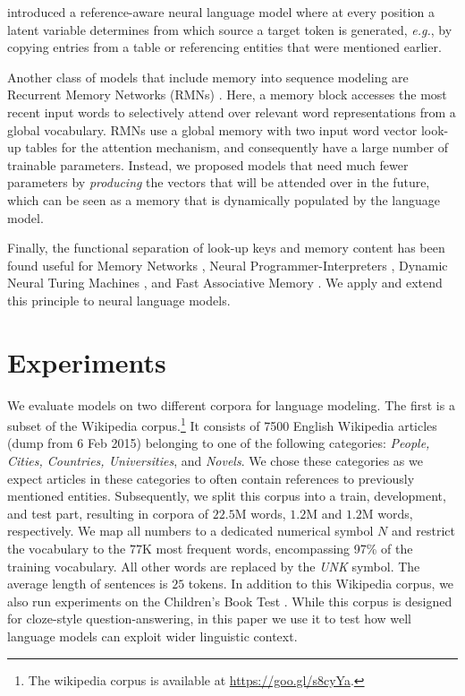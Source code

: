 \documentclass{article}
\newcommand{\eg}{{\emph{e.g.}}}
\begin{document}
\cite{yang2016reference} introduced a reference-aware neural language model where at every position a latent variable determines from which source a target token is generated, \eg{}, by copying entries from a table or referencing entities that were mentioned earlier.

Another class of models that include memory into sequence modeling are Recurrent Memory Networks (RMNs) \citep{tran2016recurrent}. 
Here, a memory block accesses the most recent input words to selectively attend over relevant word representations from a global vocabulary. 
RMNs use a global memory with two input word vector look-up tables for the attention mechanism, and consequently have a large number of trainable parameters. Instead, we proposed models that need much fewer parameters by \emph{producing} the vectors that will be attended over in the future, which can be seen as a memory that is dynamically populated by the language model.

Finally, the functional separation of look-up keys and memory content has been found useful for Memory Networks \citep{MIL16}, Neural Programmer-Interpreters \citep{reed2015neural}, Dynamic Neural Turing Machines \citep{gulcehre2016dynamic}, and Fast Associative Memory \citep{ba2016using}. 
We apply and extend this principle to neural language models. 







\section{Experiments}
We evaluate models on two different corpora for language modeling.
The first is a subset of the Wikipedia corpus.\footnote{The wikipedia corpus is available at \url{https://goo.gl/s8cyYa}.}
It consists of 7500 English Wikipedia articles (dump from 6 Feb 2015) belonging to one of the following categories: \emph{People, Cities, Countries, Universities}, and \emph{Novels}.
We chose these categories as we expect articles in these categories to often contain references to previously mentioned entities.
Subsequently, we split this corpus into a train, development, and test part, resulting in corpora of $22.5$M words, $1.2$M and $1.2$M words, respectively. 
We map all numbers to a dedicated numerical symbol $N$ and restrict the vocabulary to the $77$K most frequent words, encompassing 97\% of the training vocabulary. 
All other words are replaced by the \textit{UNK} symbol. The average length of sentences is $25$ tokens. 
In addition to this Wikipedia corpus, we also run experiments on the Children’s Book Test \citep[CBT][]{hill2015goldilocks}. 
While this corpus is designed for cloze-style question-answering, in this paper we use it to test how well language models can exploit wider linguistic context.
\end{document}
